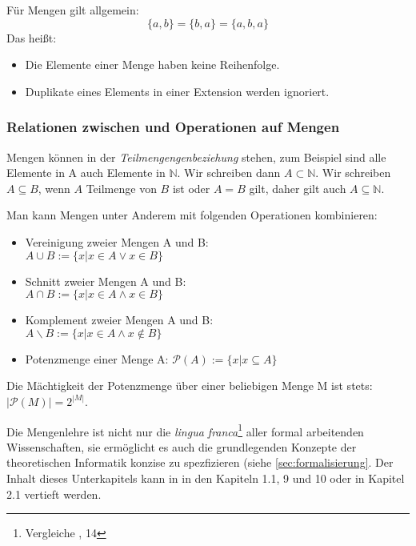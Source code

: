 Für Mengen gilt allgemein:
\[ \{a,b\} = \{b,a\} = \{a,b,a\} \]
Das heißt:
\begin{itemize}
    \item Die Elemente einer Menge haben keine Reihenfolge.
    \item Duplikate eines Elements in einer Extension werden ignoriert.
\end{itemize}



\subsubsection{Relationen zwischen und Operationen auf Mengen}

Mengen können in der \emph{Teilmengengenbeziehung} stehen,
zum Beispiel sind alle Elemente in A auch Elemente in $\mathbb{N}$.
Wir schreiben dann $A \subset \mathbb{N}$.
Wir schreiben $A \subseteq B$, wenn $A$ Teilmenge von $B$ ist oder $A = B$ gilt,
daher gilt auch $A \subseteq \mathbb{N}$.

Man kann Mengen unter Anderem mit folgenden Operationen kombinieren:
\begin{itemize}
    \item Vereinigung zweier Mengen A und B:\\
        $A \cup B := \{x|x \in A \vee x \in B\}$
    \item Schnitt zweier Mengen A und B:\\
        $A \cap B := \{x|x \in A \wedge x \in B\}$
    \item Komplement zweier Mengen A und B:\\
        $A \backslash B:= \{x|x \in A \wedge x \notin B\}$
    \item Potenzmenge einer Menge A: $\mathcal{P}(A) := \{x|x \subseteq A\}$
\end{itemize}

Die Mächtigkeit der Potenzmenge über einer beliebigen Menge M ist stets:
$|\mathcal{P}(M)| = 2^{|M|}$.


Die Mengenlehre ist nicht nur die \emph{lingua franca}\footnote{Vergleiche \cite{link}, 14}
aller formal arbeitenden Wissenschaften,
sie ermöglicht es auch die grundlegenden Konzepte der theoretischen Informatik
konzise zu spezfizieren (siehe \autoref{sec:formalisierung}.
Der Inhalt dieses Unterkapitels kann in \cite{link}
in den Kapiteln 1.1, 9 und 10 oder in
\cite{hoffmann} Kapitel 2.1 vertieft werden.

